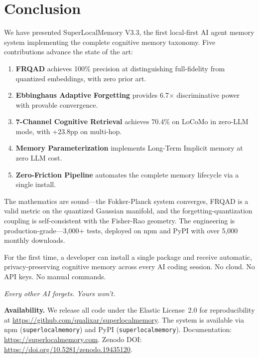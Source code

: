\section{Conclusion}
\label{sec:conclusion}

We have presented SuperLocalMemory V3.3, the first local-first AI agent memory system implementing the complete cognitive memory taxonomy. Five contributions advance the state of the art:

\begin{enumerate}[topsep=2pt, itemsep=1pt]
  \item \textbf{FRQAD} achieves 100\% precision at distinguishing full-fidelity from quantized embeddings, with zero prior art.
  \item \textbf{Ebbinghaus Adaptive Forgetting} provides 6.7$\times$ discriminative power with provable convergence.
  \item \textbf{7-Channel Cognitive Retrieval} achieves 70.4\% on LoCoMo in zero-LLM mode, with +23.8pp on multi-hop.
  \item \textbf{Memory Parameterization} implements Long-Term Implicit memory at zero LLM cost.
  \item \textbf{Zero-Friction Pipeline} automates the complete memory lifecycle via a single install.
\end{enumerate}

The mathematics are sound---the Fokker-Planck system converges, FRQAD is a valid metric on the quantized Gaussian manifold, and the forgetting-quantization coupling is self-consistent with the Fisher-Rao geometry. The engineering is production-grade---3,000+ tests, deployed on npm and PyPI with over 5,000 monthly downloads.

For the first time, a developer can install a single package and receive automatic, privacy-preserving cognitive memory across every AI coding session. No cloud. No API keys. No manual commands.

\emph{Every other AI forgets. Yours won't.}

\vspace{12pt}
\noindent\textbf{Availability.} We release all code under the Elastic License~2.0 for reproducibility at \url{https://github.com/qualixar/superlocalmemory}. The system is available via npm (\texttt{superlocalmemory}) and PyPI (\texttt{superlocalmemory}). Documentation: \url{https://superlocalmemory.com}. Zenodo DOI: \url{https://doi.org/10.5281/zenodo.19435120}.

